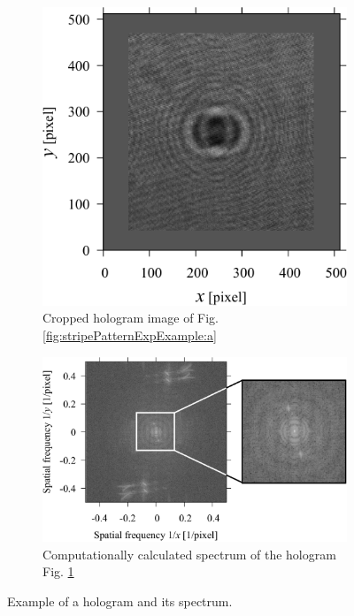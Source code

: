 \begin{figure}[htbp!]
\begin{subfigure}[c]{0.45\linewidth}
        \includegraphics[width=\linewidth]{./Figure/4_Results/stripe_pattern_experiment/recorded_data/b.pdf}
        \caption{Cropped hologram image of Fig. \ref{fig:stripePatternExpExample:a}}
        \label{fig:stripePatternExpExample:b}
    \end{subfigure}

    \begin{subfigure}[b]{0.8\linewidth}
        \includegraphics[width=\linewidth]{./Figure/4_Results/stripe_pattern_experiment/recorded_data/c.pdf}
        \caption{Computationally calculated spectrum of the hologram Fig. \ref{fig:stripePatternExpExample:b}}
        \label{fig:stripePatternExpExample:c}
    \end{subfigure}

    \caption{Example of a hologram and its spectrum. } 
    \label{fig:stripePatternExpExample}
\end{figure}

